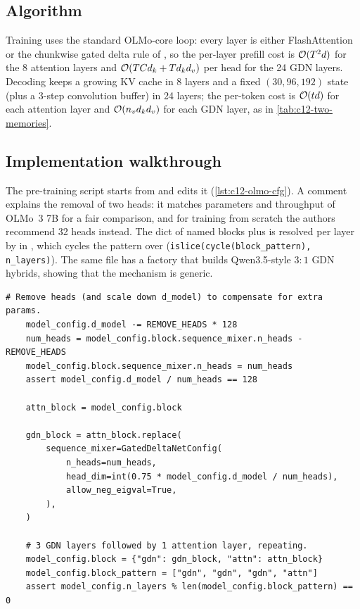 \subsection{Algorithm}

Training uses the standard OLMo-core loop: every layer is either FlashAttention or the chunkwise
gated delta rule of \fla{}, so the per-layer prefill cost is $\mathcal{O}(T^2d)$ for the 8 attention
layers and $\mathcal{O}(TCd_k + Td_kd_v)$ per head for the 24 GDN layers. Decoding keeps a growing KV
cache in 8 layers and a fixed $(30, 96, 192)$ state (plus a 3-step convolution buffer) in 24
layers; the per-token cost is $\mathcal{O}(td)$ for each attention layer and $\mathcal{O}(n_vd_kd_v)$ for each
GDN layer, as in \cref{tab:c12-two-memories}.

\subsection{Implementation walkthrough}

\begin{implnote}[title={In the code: building the hybrid from the OLMo~3 config}]
The pre-training script 
starts from  and edits it (\cref{lst:c12-olmo-cfg}). A comment
explains the removal of two heads: it matches parameters and throughput of OLMo~3 7B for a fair
comparison, and for training from scratch the authors recommend 32 heads instead. The dict of
named blocks plus  is resolved per layer by  in
, which cycles the pattern over 
(\texttt{islice(cycle(block\_pattern), n\_layers)}). The same file has a  factory
that builds Qwen3.5-style $3{:}1$ GDN hybrids, showing that the mechanism is generic.
\end{implnote}

\begin{lstlisting}[caption={Excerpt from \texttt{repos/\allowbreak allenai\_\_OLMo-core/\allowbreak src/\allowbreak scripts/\allowbreak official/\allowbreak OLMo-hybrid/\allowbreak OLMo-hybrid-7B-pretrain.py}.},label={lst:c12-olmo-cfg}]
    # Remove heads (and scale down d_model) to compensate for extra params.
    model_config.d_model -= REMOVE_HEADS * 128
    num_heads = model_config.block.sequence_mixer.n_heads - REMOVE_HEADS
    model_config.block.sequence_mixer.n_heads = num_heads
    assert model_config.d_model / num_heads == 128

    attn_block = model_config.block

    gdn_block = attn_block.replace(
        sequence_mixer=GatedDeltaNetConfig(
            n_heads=num_heads,
            head_dim=int(0.75 * model_config.d_model / num_heads),
            allow_neg_eigval=True,
        ),
    )

    # 3 GDN layers followed by 1 attention layer, repeating.
    model_config.block = {"gdn": gdn_block, "attn": attn_block}
    model_config.block_pattern = ["gdn", "gdn", "gdn", "attn"]
    assert model_config.n_layers % len(model_config.block_pattern) == 0
\end{lstlisting}

